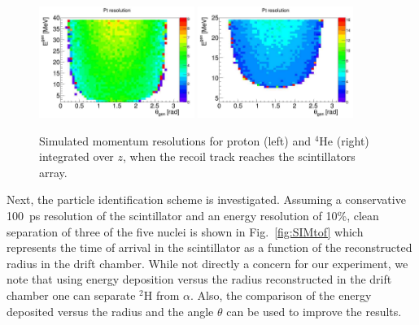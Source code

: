 \begin{figure}[tbp]
    \begin{center}
        \includegraphics[width=0.45\textwidth]{./../Detector/fig-chap2/Bare_3atm_1atm_Proton_ResoPt}%
        \includegraphics[width=0.45\textwidth]{./../Detector/fig-chap2/Bare_3atm_1atm_Alpha_ResoPt}%
        \caption{Simulated momentum resolutions for proton (left) and $^4$He (right) integrated over $z$, when the recoil track reaches the scintillators array.\label{fig:presolution}}
    \end{center}
\end{figure}

Next, the particle identification scheme is investigated. Assuming a conservative 100~ps resolution of the scintillator and an energy resolution of 10\%, clean separation of three of the five nuclei is shown in Fig.~\ref{fig:SIMtof} which represents the time of arrival in the scintillator as a function of the reconstructed radius in the drift chamber. While not directly a concern for our experiment, we note that using energy deposition versus the radius reconstructed in the drift chamber one can separate $^2$H from $\alpha$. Also, the comparison of the energy deposited versus the radius and the angle $\theta$ can be used to improve the results.\\


